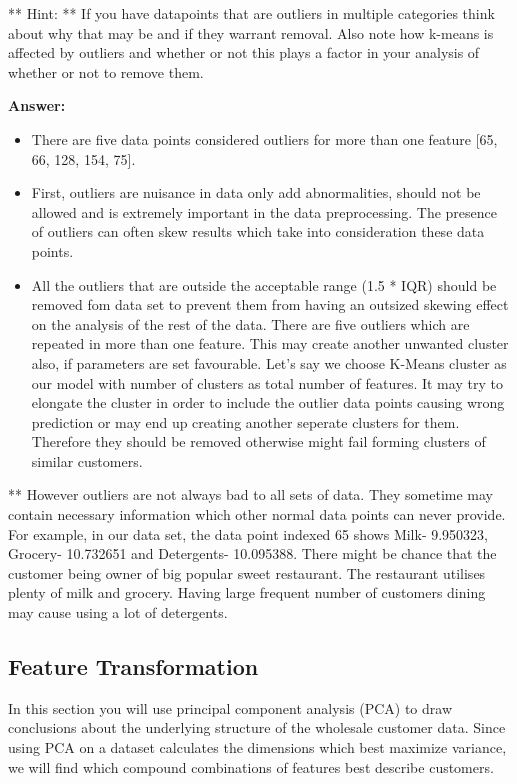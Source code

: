 \documentclass[11pt]{article}
\begin{document}
** Hint: ** If you have datapoints that are outliers in multiple
categories think about why that may be and if they warrant removal. Also
note how k-means is affected by outliers and whether or not this plays a
factor in your analysis of whether or not to remove them.

    \textbf{Answer:}

\begin{itemize}
\item
  There are five data points considered outliers for more than one
  feature {[}65, 66, 128, 154, 75{]}.
\item
  First, outliers are nuisance in data only add abnormalities, should
  not be allowed and is extremely important in the data preprocessing.
  The presence of outliers can often skew results which take into
  consideration these data points.
\item
  All the outliers that are outside the acceptable range (1.5 * IQR)
  should be removed fom data set to prevent them from having an outsized
  skewing effect on the analysis of the rest of the data. There are five
  outliers which are repeated in more than one feature. This may create
  another unwanted cluster also, if parameters are set favourable. Let's
  say we choose K-Means cluster as our model with number of clusters as
  total number of features. It may try to elongate the cluster in order
  to include the outlier data points causing wrong prediction or may end
  up creating another seperate clusters for them. Therefore they should
  be removed otherwise might fail forming clusters of similar customers.
\end{itemize}

** However outliers are not always bad to all sets of data. They
sometime may contain necessary information which other normal data
points can never provide. For example, in our data set, the data point
indexed 65 shows Milk- 9.950323, Grocery- 10.732651 and Detergents-
10.095388. There might be chance that the customer being owner of big
popular sweet restaurant. The restaurant utilises plenty of milk and
grocery. Having large frequent number of customers dining may cause
using a lot of detergents.

    \hypertarget{feature-transformation}{%
\subsection{Feature Transformation}\label{feature-transformation}}

In this section you will use principal component analysis (PCA) to draw
conclusions about the underlying structure of the wholesale customer
data. Since using PCA on a dataset calculates the dimensions which best
maximize variance, we will find which compound combinations of features
best describe customers.
\end{document}
